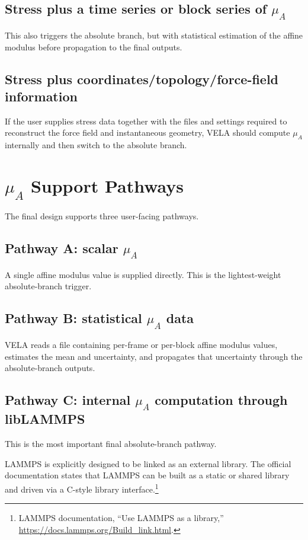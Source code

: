 \documentclass[11pt]{article}
\begin{document}
\subsection{Stress plus a time series or block series of $\mu_A$}
This also triggers the absolute branch, but with statistical estimation of the affine modulus before propagation to the final outputs.

\subsection{Stress plus coordinates/topology/force-field information}
If the user supplies stress data together with the files and settings required to reconstruct the force field and instantaneous geometry, VELA should compute $\mu_A$ internally and then switch to the absolute branch.

\section{$\mu_A$ Support Pathways}

The final design supports three user-facing pathways.

\subsection{Pathway A: scalar $\mu_A$}
A single affine modulus value is supplied directly. This is the lightest-weight absolute-branch trigger.

\subsection{Pathway B: statistical $\mu_A$ data}
VELA reads a file containing per-frame or per-block affine modulus values, estimates the mean and uncertainty, and propagates that uncertainty through the absolute-branch outputs.

\subsection{Pathway C: internal $\mu_A$ computation through libLAMMPS}
This is the most important final absolute-branch pathway.

LAMMPS is explicitly designed to be linked as an external library. The official documentation states that LAMMPS can be built as a static or shared library and driven via a C-style library interface.\footnote{LAMMPS documentation, ``Use LAMMPS as a library,'' \url{https://docs.lammps.org/Build_link.html}.}
\end{document}
